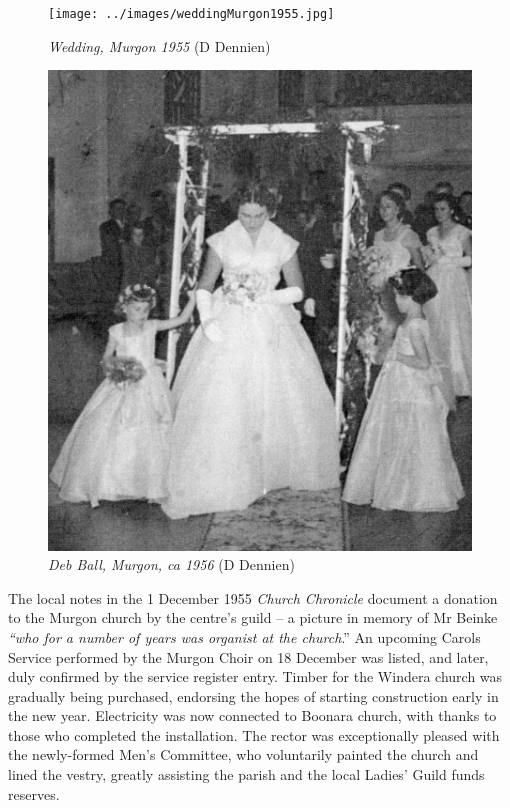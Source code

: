 \begin{figure}
\begin{center}
\texttt{[image: ../images/weddingMurgon1955.jpg]}
\caption{{\itshape Wedding, Murgon 1955} {\scriptsize(D Dennien)}}
\end{center}
\end{figure}










\begin{figure}
\begin{center}
\includegraphics[width=.9\linewidth,center]{../images/debBallMurgon.jpg}
\caption{{\itshape Deb Ball, Murgon, ca 1956} {\scriptsize(D Dennien)}}
\end{center}
\end{figure}




The local notes in the 1 December 1955 \emph{Church Chronicle} document a donation to the Murgon church by the centre's guild -- a picture in memory of Mr Beinke \emph{``who for a number of years was organist at the church}.'' An upcoming Carols Service performed by the Murgon Choir on 18 December was listed, and later, duly confirmed by the service register entry. Timber for the Windera church was gradually being purchased, endorsing the hopes of starting construction early in the new year. Electricity was now connected to Boonara church, with thanks to those who completed the installation. The rector was exceptionally pleased with the newly-formed Men's Committee, who voluntarily painted the church and lined the vestry, greatly assisting the parish and the local Ladies' Guild funds reserves.



